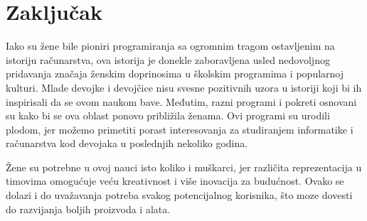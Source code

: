 \documentclass[12pt]{article}
\begin{document}
\newpage

\section{Zaključak}

Iako su žene bile pioniri programiranja sa ogromnim tragom ostavljenim na istoriju računarstva, ova istorija je donekle zaboravljena usled nedovoljnog pridavanja značaja ženskim doprinosima u školskim programima i popularnoj kulturi. Mlade devojke i devojčice nisu svesne pozitivnih uzora u istoriji koji bi ih inspirisali da se ovom naukom bave. Međutim, razni programi i pokreti osnovani su kako bi se ova oblast ponovo približila ženama. Ovi programi su urodili plodom, jer možemo primetiti porast interesovanja za studiranjem informatike i računarstva kod devojaka u poslednjih nekoliko godina.

Žene su potrebne u ovoj nauci isto koliko i muškarci, jer različita reprezentacija u timovima omogućuje veću kreativnost i više inovacija za budućnost. Ovako se dolazi i do uvažavanja potreba svakog potencijalnog korisnika, što moze dovesti do razvijanja boljih proizvoda i alata.

\newpage
\end{document}
